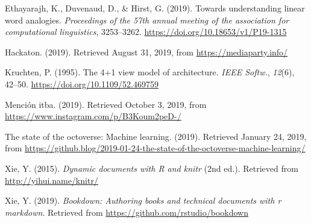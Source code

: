 \documentclass[12pt,a4paper,]{scrartcl}
\begin{document}
\leavevmode\hypertarget{ref-ethayarajh-etal-2019-towards}{}%
Ethayarajh, K., Duvenaud, D., \& Hirst, G. (2019). Towards understanding linear word analogies. \emph{Proceedings of the 57th annual meeting of the association for computational linguistics}, 3253--3262. \url{https://doi.org/10.18653/v1/P19-1315}

\leavevmode\hypertarget{ref-hackaton2019}{}%
Hackaton. (2019). Retrieved August 31, 2019, from \url{https://mediaparty.info/}

\leavevmode\hypertarget{ref-Kruchten:1995:VMA:624610.625529}{}%
Kruchten, P. (1995). The 4+1 view model of architecture. \emph{IEEE Softw.}, \emph{12}(6), 42--50. \url{https://doi.org/10.1109/52.469759}

\leavevmode\hypertarget{ref-mediaparty2019_win}{}%
Mención itba. (2019). Retrieved October 3, 2019, from \url{https://www.instagram.com/p/B3Koum2peD-/}

\leavevmode\hypertarget{ref-github_machine_learning}{}%
The state of the octoverse: Machine learning. (2019). Retrieved January 24, 2019, from \url{https://github.blog/2019-01-24-the-state-of-the-octoverse-machine-learning/}

\leavevmode\hypertarget{ref-xie2015}{}%
Xie, Y. (2015). \emph{Dynamic documents with R and knitr} (2nd ed.). Retrieved from \url{http://yihui.name/knitr/}

\leavevmode\hypertarget{ref-R-bookdown}{}%
Xie, Y. (2019). \emph{Bookdown: Authoring books and technical documents with r markdown}. Retrieved from \url{https://github.com/rstudio/bookdown}
\end{document}
